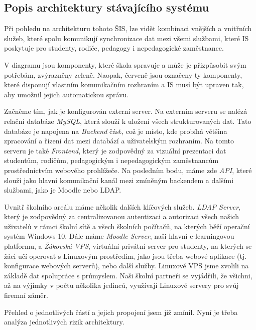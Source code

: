\documentclass[FM,Proj]{tulthesis}
\begin{document}


\subsection*{Popis architektury stávajícího systému}

Při pohledu na architekturu tohoto ŠIS, lze vidět kombinaci vnějších a vnitřních služeb,
které spolu komunikují synchronizace dat mezi všemi službami, které IS poskytuje pro studenty,
rodiče, pedagogy i nepedagogické zaměstnance.

V diagramu jsou komponenty, které škola spravuje a může je přizpůsobit svým potřebám,
zvýrazněny zeleně. Naopak, červeně jsou označeny ty komponenty, které disponují vlastním
komunikačním rozhraním a IS musí být upraven tak, aby umožnil jejich automatickou správu.

Začněme tím, jak je konfigurován externí server.
Na externím serveru se nalézá relační databáze \textit{MySQL}, která slouží k uložení všech  
strukturovaných dat. Tato databáze je napojena na \textit{Backend} část, což je místo, kde probíhá
většina zpracování a řízení dat mezi databází a uživatelským rozhraním. Na tomto serveru je také
\textit{Frontend}, který je zodpovědný za vizuální prezentaci dat studentům, rodičům, pedagogickým i
nepedagogickým zaměstnancům prostřednictvím webového prohlížeče. Na posledním bodu, máme zde \textit{API},
které slouží jako hlavní komunikační kanál mezi zmíněným backendem a dalšími službami,
jako je Moodle nebo LDAP.

Uvnitř školního areálu máme několik dalších klíčových služeb. \textit{LDAP Server}, který je
zodpovědný za centralizovanou autentizaci a autorizaci všech našich uživatelů v rámci školní
sítě a všech školních počítačů, na kterých běží operační systém Windows 10. Dále máme \textit{Moodle Server},
naši hlavní e-learningovou platformu, a \textit{Žákovská VPS}, 
virtuální privátní server pro studenty, na kterých se žáci učí operovat s Linuxovým prostředím,
jako jsou třeba webové aplikace (tj. konfigurace webových serverů), nebo další služby.
Linuxové VPS jsme zvolili na základě dat spolupráce s průmyslem. Naši školní partneři se vyjádřili,
že všichni, až na výjimky v počtu několika jedinců, využívají Linuxové servery pro svůj firemní záměr. 

Přehled o jednotlivých částí a jejich propojení jsem již zmínil. Nyní je třeba analýza jednotlivých rizik architektury.
\end{document}
